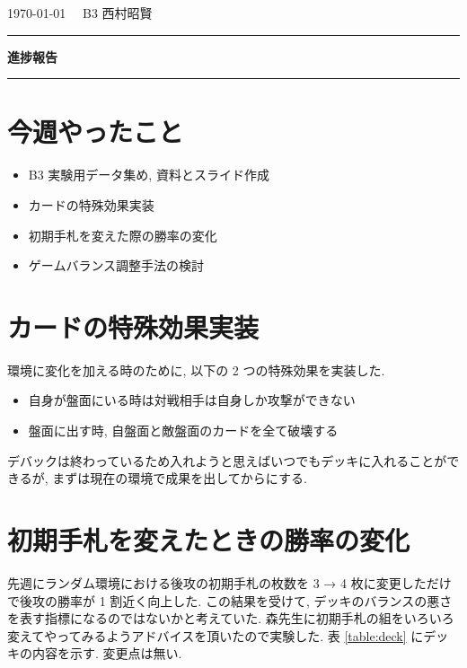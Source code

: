 \documentclass{jarticle}     %
\begin{document}
  \noindent
  \onecolumn
  \hspace{1em}

  \today
  \hfill
  \ \ B3 西村昭賢 

  \vspace{2mm}
  \hrule
  \begin{center}
  {\Large \bf 進捗報告}
  \end{center}
  \hrule
  \vspace{3mm}


\section{今週やったこと}
\begin{itemize}
  \item B3 実験用データ集め, 資料とスライド作成
  \item カードの特殊効果実装
  \item 初期手札を変えた際の勝率の変化
  \item ゲームバランス調整手法の検討
\end{itemize}

\section{カードの特殊効果実装}
環境に変化を加える時のために, 以下の 2 つの特殊効果を実装した.
\begin{itemize}
  \item 自身が盤面にいる時は対戦相手は自身しか攻撃ができない 
  \item 盤面に出す時, 自盤面と敵盤面のカードを全て破壊する
\end{itemize}
デバックは終わっているため入れようと思えばいつでもデッキに入れることができるが, まずは現在の環境で成果を出してからにする.

\section{初期手札を変えたときの勝率の変化}
先週にランダム環境における後攻の初期手札の枚数を 3 → 4 枚に変更しただけで後攻の勝率が 1 割近く向上した. この結果を受けて, デッキのバランスの悪さを表す指標になるのではないかと考えていた. 森先生に初期手札の組をいろいろ変えてやってみるようアドバイスを頂いたので実験した. 表 \ref{table:deck} にデッキの内容を示す. 変更点は無い.
\end{document}
